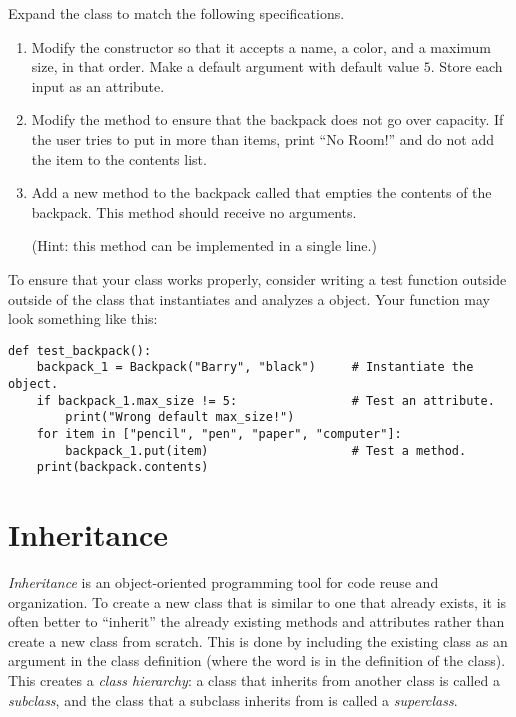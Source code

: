 \begin{problem}
Expand the  class to match the following specifications.
\begin{enumerate}
\item Modify the constructor so that it accepts a name, a color, and a maximum size, in that order.
Make  a default argument with default value $5$.
Store each input as an attribute.

\item Modify the  method to ensure that the backpack does not go over capacity.
If the user tries to put in more than  items, print ``No Room!'' and do not add the item to the contents list.

\item Add a new method to the backpack called  that empties the contents of the backpack.
This method should receive no arguments.

(Hint: this method can be implemented in a single line.)
\end{enumerate}

To ensure that your class works properly, consider writing a test function outside outside of the  class that instantiates and analyzes a  object.
Your function may look something like this:
\begin{lstlisting}
def test_backpack():
    backpack_1 = Backpack("Barry", "black")     # Instantiate the object.
    if backpack_1.max_size != 5:                # Test an attribute.
        print("Wrong default max_size!")
    for item in ["pencil", "pen", "paper", "computer"]:
        backpack_1.put(item)                    # Test a method.
    print(backpack.contents)
\end{lstlisting}
\end{problem}


\section*{Inheritance}

\emph{Inheritance} is an object-oriented programming tool for code reuse and organization.
To create a new class that is similar to one that already exists, it is often better to ``inherit'' the already existing methods and attributes rather than create a new class from scratch.
This is done by including the existing class as an argument in the class definition (where the word  is in the definition of the  class).
This creates a \emph{class hierarchy}: a class that inherits from another class is called a \emph{subclass}, and the class that a subclass inherits from is called a \emph{superclass}.

